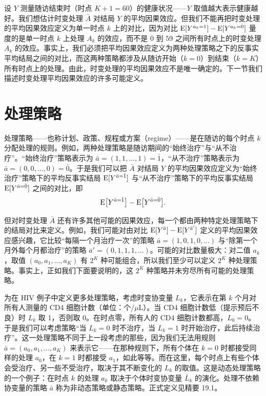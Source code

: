 
设 $Y$ 测量随访结束时（时点 $K+1=60$）的健康状况——$Y$ 取值越大表示健康越好。我们想估计时变处理 $\bar{A}$ 对结局 $Y$ 的平均因果效应。但我们不能再把时变处理的平均因果效应定义为单一时点 $k$ 上的对比，因为对比 $\mathrm{E}[Y^{a_k=1}]-\mathrm{E}[Y^{a_k=0}]$ 量度的是单一时点 $k$ 上处理 $A_k$ 的效应，而不是 0 到 59 之间所有时点上的时变处理 $A_k$ 的效应。事实上，我们必须把平均因果效应定义为两种处理策略之下的反事实平均结局之间的对比，而这两种策略都涉及从随访开始（$k=0$）到结束（$k=K$）所有时点上的处理。由此，时变处理的平均因果效应不是唯一确定的。下一节我们描述时变处理平均因果效应的许多可能定义。


\section{处理策略}

处理策略——也称计划、政策、规程或方案（regime）——是在随访的每个时点 $k$ 分配处理的规则。例如，两种处理策略是随访期间的“始终治疗”与“从不治疗”。“始终治疗”策略表示为 $\bar{a}=(1,1,\ldots,1)=\bar{1}$，“从不治疗”策略表示为 $\bar{a}=(0,0,\ldots,0)=\bar{0}$。于是我们可以把 $\bar{A}$ 对结局 $Y$ 的平均因果效应定义为“始终治疗”策略下的平均反事实结局 $\mathrm{E}[Y^{\bar{a}=\bar{1}}]$ 与“从不治疗”策略下的平均反事实结局 $\mathrm{E}[Y^{\bar{a}=\bar{0}}]$ 之间的对比，即
\[
\mathrm{E}\bigl[Y^{\bar{a}=\bar{1}}\bigr]-\mathrm{E}\bigl[Y^{\bar{a}=\bar{0}}\bigr].
\]


但对时变处理 $\bar{A}$ 还有许多其他可能的因果效应，每一个都由两种特定处理策略下的结局对比来定义。例如，我们可能对由对比 $\mathrm{E}[Y^{\bar{a}}]-\mathrm{E}[Y^{\bar{a}'}]$ 定义的平均因果效应感兴趣，它比较“每隔一个月治疗一次”的策略 $\bar{a}=(1,0,1,0,\ldots)$ 与“除第一个月外每个月都治疗”的策略 $\bar{a}'=(0,1,1,1,\ldots)$。可能的对比数量极大：对二值 $a_k$，取值 $(a_0,a_1,\ldots,a_K)$ 有 $2^K$ 种可能组合，所以我们至少可以定义 $2^K$ 种处理策略。事实上，正如我们下面要说明的，这 $2^K$ 种策略并未穷尽所有可能的处理策略。


为在 HIV 例子中定义更多处理策略，考虑时变协变量 $L_k$，它表示在第 $k$ 个月对所有人测量的 CD4 细胞计数（单位：个/$\mu$L）。当 CD4 细胞计数低（提示预后不良）时 $L_k$ 取 1，否则取 0。在时点零，所有人的 CD4 细胞计数都高，$L_0=0$。于是我们可以考虑策略“当 $L_k=0$ 时不治疗，当 $L_k=1$ 时开始治疗，此后持续治疗”。这一处理策略不同于上一段考虑的那些，因为我们无法用规则 $\bar{a}=(a_0,a_1,\ldots,a_K)$ 来表示它——在那种规则下，所有个体在 $k=0$ 时都接受同样的处理 $a_0$，在 $k=1$ 时都接受 $a_1$，如此等等。而在这里，每个时点上有些个体会受治疗、另一些不受治疗，取决于其不断变化的 $L_k$ 的取值。这是动态处理策略的一个例子：在时点 $k$ 的处理 $a_k$ 取决于个体时变协变量 $\bar{L}_k$ 的演化。处理不依赖协变量的策略 $\bar{a}$ 称为非动态策略或静态策略。正式定义见精要 19.1。

